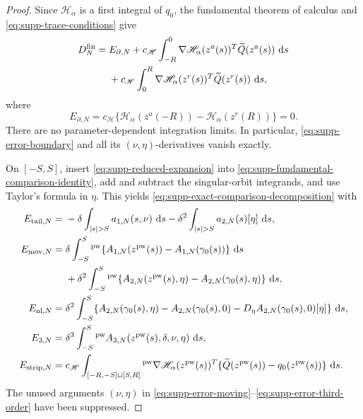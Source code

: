 \begin{proof}
Since \(\mathscr H_\alpha\) is a first integral of \(q_0\), the
fundamental theorem of calculus and \eqref{eq:supp-trace-conditions} give
\begin{align}
 D_N^{\rm fin}
 ={}&E_{\partial,N}
 +c_{\mathscr H}\int_{-R}^0
  \nabla\mathscr H_\alpha(z^a(s))^T
       \widetilde Q(z^a(s))\,\,\mathrm d s\notag\\
 &+c_{\mathscr H}\int_0^R
  \nabla\mathscr H_\alpha(z^r(s))^T
       \widetilde Q(z^r(s))\,\,\mathrm d s,
 \label{eq:supp-fundamental-comparison-identity}
\end{align}
where
\begin{equation}
 E_{\partial,N}=c_{\mathscr H}\{
 \mathscr H_\alpha(z^a(-R))-\mathscr H_\alpha(z^r(R))\}=0.
 \label{eq:supp-error-boundary}
\end{equation}
There are no parameter-dependent integration limits.  In particular,
\eqref{eq:supp-error-boundary} and all its \((\nu,\eta)\)-derivatives
vanish exactly.

On \([-S,S]\), insert \eqref{eq:supp-reduced-expansion} into
\eqref{eq:supp-fundamental-comparison-identity}, add and subtract the
singular-orbit integrands, and use Taylor's formula in \(\eta\).  This yields
\eqref{eq:supp-exact-comparison-decomposition} with
\begin{align}
 E_{{\rm tail},N}
 ={}&-\delta\int_{\left\lvert s\right\rvert>S}a_{1,N}(s,\nu)\,\,\mathrm d s
     -\delta^2\int_{\left\lvert s\right\rvert>S}a_{2,N}(s)[\eta]\,\,\mathrm d s,
 \label{eq:supp-error-tail}\\
 E_{{\rm mov},N}
 ={}&\delta\int_{-S}^S{}^{\rm pw}
  \{A_{1,N}(z^{\rm pw}(s))-A_{1,N}(\gamma_0(s))\}\,\,\mathrm d s\notag\\
 &+\delta^2\int_{-S}^S{}^{\rm pw}
  \{A_{2,N}(z^{\rm pw}(s),\eta)
             -A_{2,N}(\gamma_0(s),\eta)\}\,\,\mathrm d s,
 \label{eq:supp-error-moving}\\
 E_{{\rm nl},N}
 ={}&\delta^2\int_{-S}^S
 \{A_{2,N}(\gamma_0(s),\eta)-A_{2,N}(\gamma_0(s),0)
       -D_\eta A_{2,N}(\gamma_0(s),0)[\eta]\}\,\,\mathrm d s,
 \label{eq:supp-error-nonlinear}\\
 E_{3,N}
 ={}&\delta^3\int_{-S}^S{}^{\rm pw}
       A_{3,N}(z^{\rm pw}(s),\delta,\nu,\eta)\,\,\mathrm d s,
 \label{eq:supp-error-third-order}\\
 E_{{\rm strip},N}
 ={}&c_{\mathscr H}
 \int_{[-R,-S]\cup[S,R]}{}^{\rm pw}
 \nabla\mathscr H_\alpha(z^{\rm pw}(s))^T
 \{\widetilde Q(z^{\rm pw}(s))-q_0(z^{\rm pw}(s))\}\,\,\mathrm d s.
 \label{eq:supp-error-strip}
\end{align}
The unused arguments \((\nu,\eta)\) in
\eqref{eq:supp-error-moving}--\eqref{eq:supp-error-third-order} have been
suppressed.


\end{proof}
